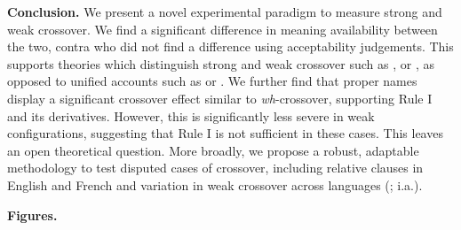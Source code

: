 \documentclass[12pt,letterpaper]{article}
\newcommand{\sectitle}[1]{\smallskip \textbf{#1.}}
\begin{document}
\sectitle{Conclusion} We present a novel experimental paradigm to measure strong and weak crossover. We find a significant difference in meaning availability between the two, contra \citet{kush_respecting_2013} who did not find a difference using acceptability judgements. This supports theories which distinguish strong and weak crossover such as \citet{koopman_variables_1982}, \citet{safir_multiple_1984} or \citet{ruys_weak_2000}, %
as opposed to unified accounts such as \citet{reinhart_anaphora_1983} or \citet{safir_syntax_2004}. %
We further find that proper names display a significant crossover effect similar to \emph{wh}-crossover, supporting Rule I \citep{grodzinsky_innateness_1993} and its derivatives. However, this is significantly less severe in weak configurations, suggesting that Rule I is not sufficient in these cases. 
This leaves an open theoretical question.
More broadly, we propose a robust, adaptable methodology to test disputed cases of crossover, including relative clauses in English and French \citep{postal_remarks_1993} %
and variation in weak crossover across languages (\citealp{bresnan_morphology_1998,lyu_weak_2017}; i.a.).


\newpage

\sectitle{Figures}
\vspace*{0.75em}
\end{document}
